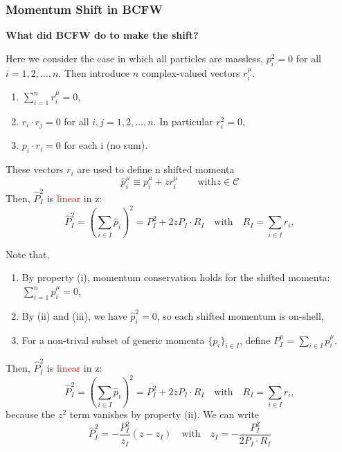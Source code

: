 \documentclass{beamer}
\begin{document}
\begin{frame}
    \frametitle{Momentum Shift in BCFW}
    \textbf{What did BCFW do to make the shift?}


    Here we consider the case in which all particles are massless, $p_i^2 = 0$ for all $i = 1, 2, \dotsc, n$. Then introduce $n$ complex-valued vectors $r_i^\mu$.
    \begin{enumerate}[label=(\roman*)]
        \item $\sum_{i=1}^n r_i^\mu=0$,
        \item $r_i\cdot r_j = 0$ for all $i,j=1, 2, \ldots, n.$ In particular $r_i^2=0$,
        \item $p_i \cdot r_i =0$ for each i (no sum). 
    \end{enumerate}

These vectors $r_i$ are used to define n shifted momenta
\begin{equation*}
    \hat{p}_i^\mu \equiv p_i^\mu + zr_i^\mu \qquad \text{with} z \in \mathcal{C}
\end{equation*}
Then, $\hat{P}_I^2$ is \textcolor{red}{linear} in z:
\begin{equation*}
    \hat{P}_I^2=\left(\sum_{i\in I} \hat{p}_i \right) ^2 = P_I^2 +2zP_I\cdot R_I \quad \text{with} \quad R_I=\sum_{i\in I} r_i ,
\end{equation*}

\end{frame}
\begin{frame}
Note that,
    \begin{enumerate}[label=(\Alph*)]
    \item By property (i), momentum conservation holds for the shifted momenta: $\sum_{i=1}^{n} \hat{p}_i^\mu =0$,
    \item By (ii) and (iii), we have $\hat{p}_i^2=0$, so each shifted momentum is on-shell,
    \item For a non-trival subset of generic momenta $\{p_i\}_{i\in I}$, define $P_I^\mu=\sum_{i\in I}p_i^\mu$.
    \end{enumerate}
Then, $\hat{P}_I^2$ is \textcolor{red}{linear} in z:
\begin{equation*}
    \hat{P}_I^2=\left(\sum_{i\in I} \hat{p}_i \right) ^2 = P_I^2 +2zP_I\cdot R_I \quad \text{with} \quad R_I=\sum_{i\in I} r_i ,
\end{equation*}
because the $z^2$ term vanishes by property (ii). We can write 
\begin{equation*}
    \hat{P}_I^2 = -\frac{P_I^2}{z_I}(z-z_I) \quad \text{with} \quad z_I=-\frac{P_I^2}{2P_I\cdot R_I}
\end{equation*}
\end{frame}
\end{document}
